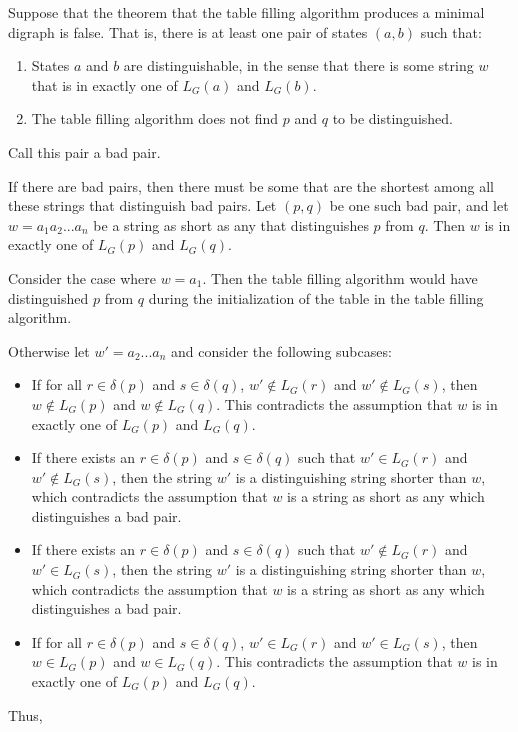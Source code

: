 Suppose that the theorem that the table filling algorithm
produces a minimal digraph is false. That is, there is at
least one pair of states $(a, b)$ such that:

\begin{enumerate}
    \item States $a$ and $b$ are distinguishable, in the sense
    that there is some string $w$ that is in exactly one of
    $L_G(a)$ and $L_G(b)$.
    \item The table filling algorithm does not find $p$ and
    $q$ to be distinguished.
\end{enumerate}

Call this pair a bad pair.

If there are bad pairs, then there
must be some that are the shortest among all these strings that
distinguish bad pairs. Let $(p,q)$ be one such bad pair, and let
$w=a_1 a_2 ... a_n$ be a string as short as any that distinguishes
$p$ from $q$. Then $w$ is in exactly one of $L_G(p)$ and $L_G(q)$.

Consider the case where $w=a_1$. Then the table filling algorithm
would have distinguished $p$ from $q$ during the initialization of
the table in the table filling algorithm.

Otherwise let $w'=a_2 ... a_n$ and consider the following subcases:
\begin{itemize}
    \item If for all $r \in \delta(p)$ and $s \in \delta(q)$,
    $w' \notin L_G(r)$ and $w' \notin L_G(s)$, then $w \notin L_G(p)$
    and $w \notin L_G(q)$. This contradicts the assumption that $w$
    is in exactly one of $L_G(p)$ and $L_G(q)$.
    \item If there exists an $r \in \delta(p)$ and $s \in \delta(q)$ such that
    $w' \in L_G(r)$ and $w' \notin L_G(s)$, then the string $w'$ is
    a distinguishing string shorter than $w$, which contradicts the
    assumption that $w$ is a string as short as any which
    distinguishes a bad pair.
    \item If there exists an $r \in \delta(p)$ and $s \in \delta(q)$ such that
    $w' \notin L_G(r)$ and $w' \in L_G(s)$, then the string $w'$ is
    a distinguishing string shorter than $w$, which contradicts the
    assumption that $w$ is a string as short as any which
    distinguishes a bad pair.
    \item If for all $r \in \delta(p)$ and $s \in \delta(q)$, $w' \in L_G(r)$
    and $w' \in L_G(s)$, then $w \in L_G(p)$ and $w \in L_G(q)$. This
    contradicts the assumption that $w$ is in exactly one of $L_G(p)$ and
    $L_G(q)$.
\end{itemize}

Thus, 